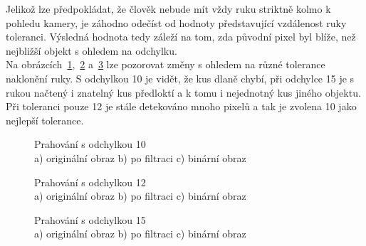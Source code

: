 Jelikož lze předpokládat, že člověk nebude mít vždy ruku striktně kolmo k pohledu kamery, je záhodno odečíst od hodnoty představující vzdálenost ruky toleranci. Výsledná hodnota tedy záleží na tom, zda původní pixel byl blíže, než nejbližší objekt s ohledem na odchylku.\\
Na obrázcích~\ref{pic12},~\ref{pic13} a~\ref{pic14} lze pozorovat změny s ohledem na různé tolerance naklonění ruky. S odchylkou 10 je vidět, že kus dlaně chybí, při odchylce 15 je s rukou načtený i znatelný kus předloktí a k tomu i nejednotný kus jiného objektu. Při toleranci pouze 12 je stále detekováno mnoho pixelů a tak je zvolena 10 jako nejlepší tolerance.\\

\begin{figure}[htp]
\centering
{} \hfill
{} \hfill
{}
\caption{Prahování s odchylkou 10 \\ a) originální obraz b) po filtraci c) binární obraz}
\label{pic12}
\end{figure}
\begin{figure}[htp]
\centering
{} \hfill
{} \hfill
{}
\caption{Prahování s odchylkou 12 \\ a) originální obraz b) po filtraci c) binární obraz}
\label{pic13}
\end{figure}
\begin{figure}[htp]
\centering
{} \hfill
{} \hfill
{}
\caption{Prahování s odchylkou 15 \\ a) originální obraz b) po filtraci c) binární obraz}
\label{pic14}
\end{figure}
\newpage
